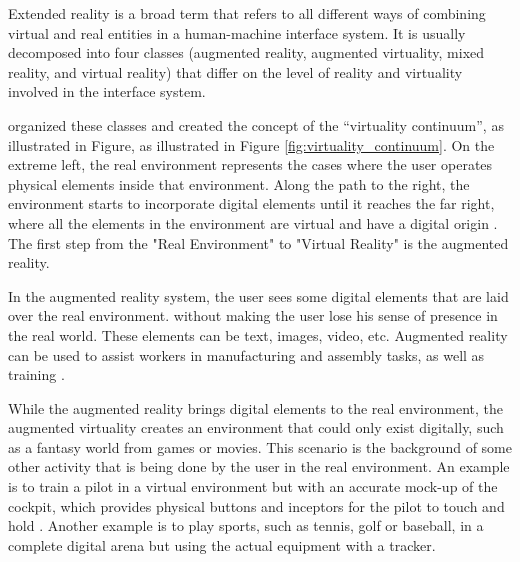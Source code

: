 Extended reality is a broad term that refers to all different ways of combining virtual and real entities in a human-machine interface system. It is usually decomposed into four classes (augmented reality, augmented virtuality, mixed reality, and virtual reality) that differ on the level of reality and virtuality involved in the interface system. 

 organized these classes and created the concept of the “virtuality continuum”, as illustrated in Figure, as illustrated in Figure \ref{fig:virtuality_continuum}. On the extreme left, the real environment represents the cases where the user operates physical elements inside that environment. Along the path to the right, the environment starts to incorporate digital elements until it reaches the far right, where all the elements in the environment are virtual and have a digital origin \cite{nijholt2005virtuality, doolani2020review}. The first step from the "Real Environment" to "Virtual Reality" is the augmented reality.




In the augmented reality system, the user sees some digital elements that are laid over the real environment. without making the user lose his sense of presence in the real world. These elements can be text, images, video, etc. Augmented reality can be used to assist workers in manufacturing and assembly tasks, as well as training \cite{doolani2020review, farrell2018learning, ma2007virtuality}.
    
While the augmented reality brings digital elements to the real environment, the augmented virtuality creates an environment that could only exist digitally, such as a fantasy world from games or movies. This scenario is the background of some other activity that is being done by the user in the real environment. An example is to train a pilot in a virtual environment but with an accurate mock-up of the cockpit, which provides physical buttons and inceptors for the pilot to touch and hold \cite{farshid2018go}. Another example is to play sports, such as tennis, golf or baseball, in a complete digital arena but using the actual equipment with a tracker.

